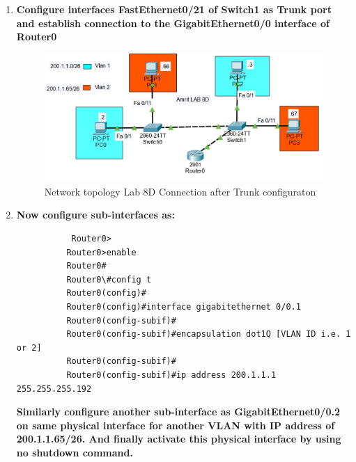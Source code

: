 \documentclass[a4paper,11pt]{article}
\begin{document}
\begin{enumerate}
    \item\textbf{ Configure interfaces FastEthernet0/21 of Switch1 as Trunk port and establish connection
              to the GigabitEthernet0/0 interface of Router0}



          \begin{figure}[H]
              \centering
              \includegraphics[scale=0.64,cframe=blue 0.5pt 3pt]{./FIG/Lab8D1.jpg}
              \caption{Network topology Lab 8D Connection after Trunk configuraton}
          \end{figure}

    \item\textbf{ Now configure sub-interfaces as:}
          \begin{verbatim}
           Router0>
          Router0>enable
          Router0#
          Router0\#config t
          Router0(config)#
          Router0(config)#interface gigabitethernet 0/0.1
          Router0(config-subif)#
          Router0(config-subif)#encapsulation dot1Q [VLAN ID i.e. 1 or 2]
          Router0(config-subif)#
          Router0(config-subif)#ip address 200.1.1.1 255.255.255.192
        \end{verbatim}
          \textbf{Similarly configure another sub-interface as GigabitEthernet0/0.2 on same physical
              interface for another VLAN with IP address of 200.1.1.65/26. And finally activate
              this physical interface by using no shutdown command.}





\end{enumerate}
\end{document}
